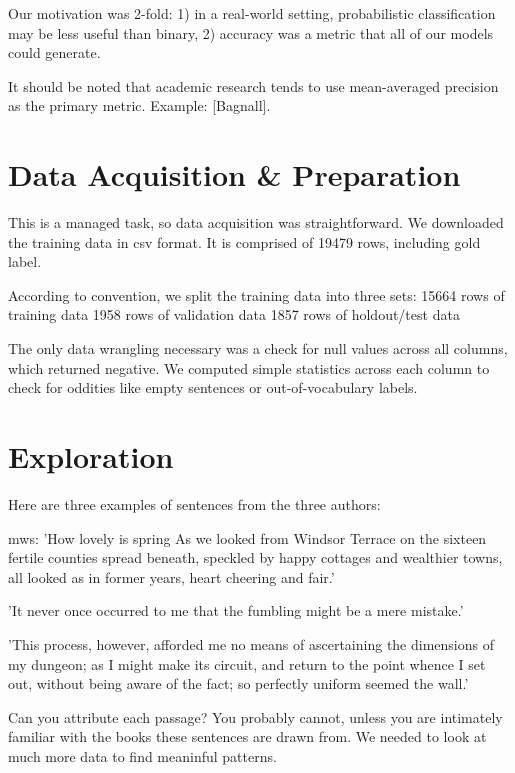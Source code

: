 \documentclass[12pt]{article}
\begin{document}
Our motivation was 2-fold: 1) in a real-world setting, probabilistic classification may be less useful than binary, 2) accuracy was a metric that all of our models could generate.

It should be noted that academic research tends to use mean-averaged precision as the primary metric. Example: [Bagnall].

\section{Data Acquisition \& Preparation}
This is a managed task, so data acquisition was straightforward. We downloaded the training data in csv format. It is comprised of 19479 rows, including gold label.

According to convention, we split the training data into three sets:
15664 rows of training data
1958 rows of validation data
1857 rows of holdout/test data

The only data wrangling necessary was a check for null values across all columns, which returned negative. We computed simple statistics across each column to check for oddities like empty sentences or out-of-vocabulary labels.


\section{Exploration}

Here are three examples of sentences from the three authors:

mws: 'How lovely is spring As we looked from Windsor Terrace on the sixteen fertile counties spread beneath, speckled by happy cottages and wealthier towns, all looked as in former years, heart cheering and fair.'

'It never once occurred to me that the fumbling might be a mere mistake.'

'This process, however, afforded me no means of ascertaining the dimensions of my dungeon; as I might make its circuit, and return to the point whence I set out, without being aware of the fact; so perfectly uniform seemed the wall.'

Can you attribute each passage? You probably cannot, unless you are intimately familiar with the books these sentences are drawn from. We needed to look at much more data to find meaninful patterns.
\end{document}
